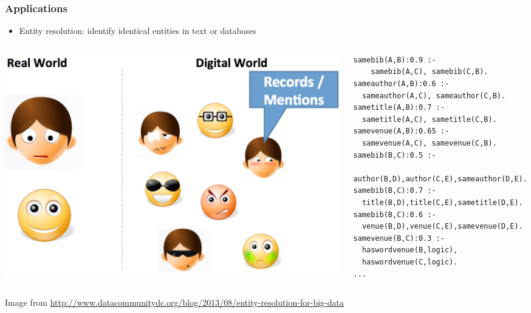 \documentclass[trans]{beamer}
\begin{document}
\begin{frame}[fragile]
  \frametitle{Applications}
\begin{itemize}
\item Entity resolution: identify identical entities in text or databases
  \end{itemize}
	\begin{columns}
	\begin{column}{0.5\textwidth}
\begin{center}
\includegraphics[scale=0.3]{entity-res.png}
\end{center}
\end{column}
\begin{column}{0.5\textwidth}
\begin{tiny}
\begin{verbatim}
samebib(A,B):0.9 :-
	samebib(A,C), samebib(C,B).
sameauthor(A,B):0.6 :-
  sameauthor(A,C), sameauthor(C,B).
sametitle(A,B):0.7 :-
  sametitle(A,C), sametitle(C,B).
samevenue(A,B):0.65 :-
  samevenue(A,C), samevenue(C,B).
samebib(B,C):0.5 :-
  author(B,D),author(C,E),sameauthor(D,E).
samebib(B,C):0.7 :-
  title(B,D),title(C,E),sametitle(D,E).
samebib(B,C):0.6 :-
  venue(B,D),venue(C,E),samevenue(D,E).
samevenue(B,C):0.3 :-
  haswordvenue(B,logic),
  haswordvenue(C,logic).
...
\end{verbatim}
\end{tiny}
\end{column}
\end{columns}
\begin{tiny}
Image from \url{http://www.datacommunitydc.org/blog/2013/08/entity-resolution-for-big-data}
\end{tiny}

\end{frame}
\end{document}
